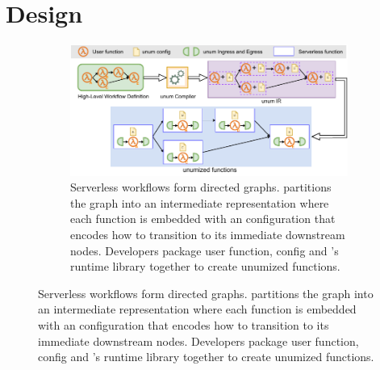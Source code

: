\section{Design}

\begin{figure}[t]
	\centering
	\begin{subfigure}[t]{0.8\textwidth}
	\centering
		\includegraphics[width=0.8\columnwidth]{figures/unum-arch-compile-time.pdf}
		\caption{Serverless workflows form directed graphs. \name{}
		partitions the graph into an intermediate representation where each
		function is embedded with an \name{} configuration that encodes how to
		transition to its immediate downstream nodes. Developers package user
		function, \name{} config and \name{}'s runtime library  together to
		create unumized functions. }
		\label{fig:arch:unum-compile-time}


\end{subfigure}
\end{figure}
